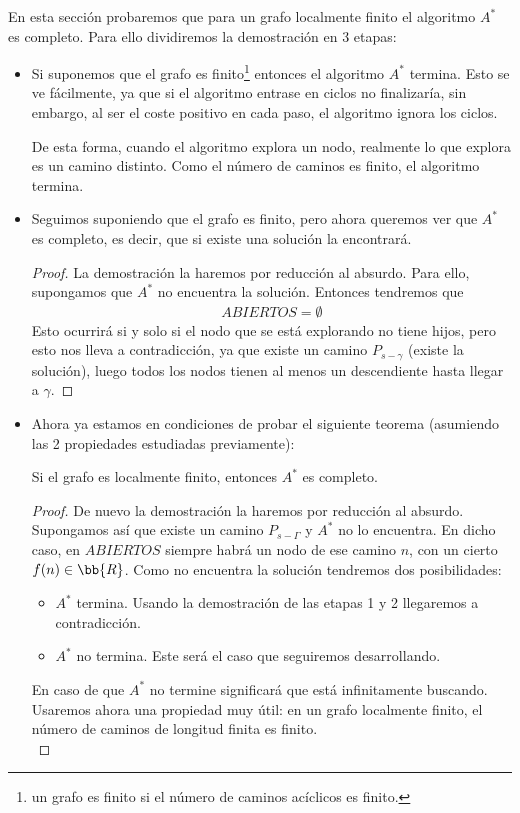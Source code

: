 En esta sección probaremos que para un grafo localmente finito el algoritmo $A^*$ es completo. Para ello dividiremos la demostración en 3 etapas:
\begin{itemize}
    \item[\textbf{Etapa 1)}] Si suponemos que el grafo es finito\footnote{un grafo es finito si el número de caminos acíclicos es finito.} entonces el algoritmo $A^*$ termina. Esto se ve fácilmente, ya que si el algoritmo entrase en ciclos no finalizaría, sin embargo, al ser el coste positivo en cada paso, el algoritmo ignora los ciclos.
    
    De esta forma, cuando el algoritmo explora un nodo, realmente lo que explora es un camino distinto. Como el número de caminos es finito, el algoritmo termina.
    
    \item[\textbf{Etapa 2)}] Seguimos suponiendo que el grafo es finito, pero ahora queremos ver que $A^*$ es completo, es decir, que si existe una solución la encontrará.
    \begin{proof}
        La demostración la haremos por reducción al absurdo. Para ello, supongamos que $A^*$ no encuentra la solución. Entonces tendremos que 
        \begin{gather*}
            ABIERTOS = \emptyset
        \end{gather*}
        Esto ocurrirá si y solo si el nodo que se está explorando no tiene hijos, pero esto nos lleva a contradicción, ya que existe un camino $P_{s-\gamma}$ (existe la solución), luego todos los nodos tienen al menos un descendiente hasta llegar a $\gamma$.
    \end{proof}

    \item[\textbf{Etapa 3)}] Ahora ya estamos en condiciones de probar el siguiente teorema (asumiendo las 2 propiedades estudiadas previamente):
    \begin{teo}[Completitud de $A^*$]
        Si el grafo es localmente finito, entonces $A^*$ es completo.

        \begin{proof}
            De nuevo la demostración la haremos por reducción al absurdo. Supongamos así que existe un camino $P_{s-\Gamma}$ y $A^*$ no lo encuentra. En dicho caso, en $ABIERTOS$ siempre habrá un nodo de ese camino $n$, con un cierto $f(n)\in \bb{R}$. Como no encuentra la solución tendremos dos posibilidades:
            \begin{itemize}
                \item $A^*$ termina. Usando la demostración de las etapas 1 y 2 llegaremos a contradicción.
                \item $A^*$ no termina. Este será el caso que seguiremos desarrollando.
            \end{itemize}
            En caso de que $A^*$ no termine significará que está infinitamente buscando. Usaremos ahora una propiedad muy útil: en un grafo localmente finito, el número de caminos de longitud finita es finito.\\


\end{proof}
\end{teo}
\end{itemize}
